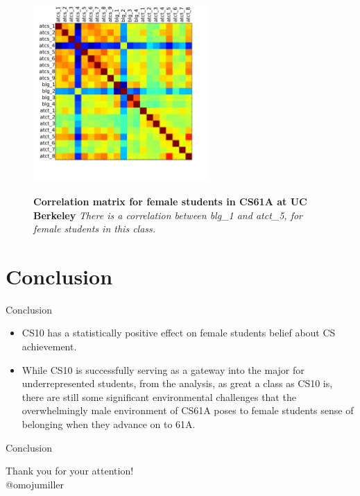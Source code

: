\documentclass{beamer}                  %
\begin{document}
\begin{frame}
  \begin{figure}[!htbp]
    \centering
    \includegraphics[width=0.6\textwidth]{cs61a_female_corr}
    \label{corr_cs61a_female}
%
\caption {\textbf{Correlation matrix for female students in CS61A at UC Berkeley}
\textit{There is a correlation between blg\_1 and atct\_5, for female students in this class. }}
\label{fig:corrFemale}
\end{figure}
\end{frame}

\section{Conclusion}

\begin{frame}{Conclusion}

  \begin{itemize}
  \item CS10 has a statistically positive effect on female students belief about CS achievement.
  \item While CS10 is successfully serving as a gateway into the major for underrepresented students, from the analysis, as great a class as CS10 is, there are still some significant environmental challenges that the overwhelmingly male environment of CS61A poses to female students sense of belonging when they advance on to 61A.
  \end{itemize}

\end{frame}

\begin{frame}{Conclusion}

  
  \centering
  Thank you for your attention!\\
  @omojumiller

\end{frame}


\clearpage
\end{document}

